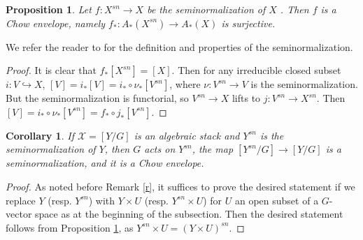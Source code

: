 \documentclass[11pt]{amsart}
\newtheorem{prop}[theorem]{Proposition}
\newtheorem{cor}[theorem]{Corollary}
\theoremstyle{definition}
\theoremstyle{remark}
\newcommand{\calX}{\mathcal X}
\begin{document}
\begin{prop}\label{prop_seminorm_is_a_chow_envelope}
Let $f:X^{sn}\to X$ be the seminormalization of $X$ . Then $f$ is a Chow envelope, namely $f_* : A_*(X^{sn})\to A_*(X)$ is surjective.
\end{prop}
We refer the reader to \cite[\href{https://stacks.math.columbia.edu/tag/0EUK}{Tag 0EUK}]{stacks-project} for the definition and properties of the seminormalization.
\begin{proof}
It is clear that $f_*[X^{sn}] = [X]$. Then for any irreducible closed subset $i:V\hookrightarrow X$, $[V] = i_*[V] = i_*\circ \nu_* [ V^{sn}]$, where $\nu:V^{sn}\to V$ is the seminormalization. But the seminormalization is functorial, so $V^{sn}\to X$ lifts to $j:V^{sn}\to X^{sn}$. Then $[V] = i_*\circ \nu_* [ V^{sn}] = f_*\circ j_* [ V^{sn}]$.
\end{proof}
\begin{cor}\label{cor_seminorm_is_chow_envelope_for_stacks}
If $\calX=[Y/G]$ is an algebraic stack and $Y^{sn}$ is the seminormalization of $Y$, then $G$ acts on $Y^{sn}$, the map $[Y^{sn}/G] \to [Y/G]$ is a seminormalization, and it is a Chow envelope.
\end{cor}
\begin{proof}
As noted before Remark \ref{r}, it suffices to prove the desired statement if we replace $Y$ (resp. $Y^{sn}$) with $Y\times U$ (resp. $Y^{sn}\times U$) for $U$ an open subset of a $G$-vector space as at the beginning of the subsection. Then the desired statement follows from Proposition \ref{prop_seminorm_is_a_chow_envelope}, as $Y^{sn}\times U = (Y\times U)^{sn}$.
\end{proof}
\end{document}
